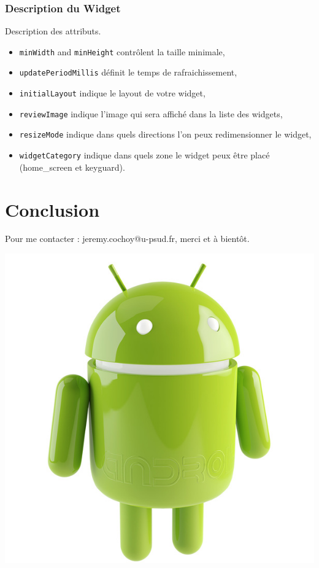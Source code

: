 \documentclass{beamer}
\begin{document}
\begin{frame}
\frametitle{Description du Widget}
\begin{block}{Description des attributs.}
\begin{itemize}
\item \verb!minWidth! and \verb!minHeight! contrôlent la taille minimale,
\item \verb!updatePeriodMillis! définit le temps de rafraichissement,
\item \verb!initialLayout! indique le layout de votre widget,
\item \verb!reviewImage! indique l'image qui sera affiché dans la liste des widgets,
\item \verb!resizeMode! indique dans quels directions l'on peux redimensionner le widget,
\item \verb!widgetCategory! indique dans quels zone le widget peux être placé (home\_screen et keyguard).
\end{itemize}
\end{block}
\end{frame}

\section{Conclusion}

\begin{frame}
\begin{center}
Pour me contacter : jeremy.cochoy@u-psud.fr, merci et à bientôt.

\medskip
\medskip
\medskip
\medskip

\includegraphics[scale=0.18]{android.jpg}
\end{center}
\end{frame}
\end{document}
